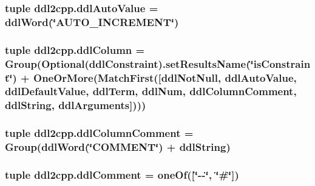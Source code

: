 \subsubsection[{ddl\+Auto\+Value}]{\setlength{\rightskip}{0pt plus 5cm}tuple ddl2cpp.\+ddl\+Auto\+Value = {\bf ddl\+Word}(\char`\"{}A\+U\+T\+O\+\_\+\+I\+N\+C\+R\+E\+M\+E\+N\+T\char`\"{})}\label{namespaceddl2cpp_adfd7af04711f00ee8c041d1a9dc8a5ff}
\hypertarget{namespaceddl2cpp_a0b84b33d051fb3679933a73f07862855}{}
\subsubsection[{ddl\+Column}]{\setlength{\rightskip}{0pt plus 5cm}tuple ddl2cpp.\+ddl\+Column = Group(Optional({\bf ddl\+Constraint}).set\+Results\+Name(\char`\"{}is\+Constraint\char`\"{}) + One\+Or\+More(Match\+First(\mbox{[}{\bf ddl\+Not\+Null}, {\bf ddl\+Auto\+Value}, {\bf ddl\+Default\+Value}, {\bf ddl\+Term}, {\bf ddl\+Num}, {\bf ddl\+Column\+Comment}, {\bf ddl\+String}, {\bf ddl\+Arguments}\mbox{]})))}\label{namespaceddl2cpp_a0b84b33d051fb3679933a73f07862855}
\hypertarget{namespaceddl2cpp_acd5cc6bf8c3155c1d9b5c96f837a56da}{}
\subsubsection[{ddl\+Column\+Comment}]{\setlength{\rightskip}{0pt plus 5cm}tuple ddl2cpp.\+ddl\+Column\+Comment = Group({\bf ddl\+Word}(\char`\"{}C\+O\+M\+M\+E\+N\+T\char`\"{}) + ddl\+String)}\label{namespaceddl2cpp_acd5cc6bf8c3155c1d9b5c96f837a56da}
\hypertarget{namespaceddl2cpp_a353ef6fb26a14fe2a057372cee430a52}{}
\subsubsection[{ddl\+Comment}]{\setlength{\rightskip}{0pt plus 5cm}tuple ddl2cpp.\+ddl\+Comment = one\+Of(\mbox{[}\char`\"{}-\/-\/\char`\"{}, \char`\"{}\#\char`\"{}\mbox{]})}\label{namespaceddl2cpp_a353ef6fb26a14fe2a057372cee430a52}
\hypertarget{namespaceddl2cpp_a97e4713ef26f221c7a6e84b47053bb04}{}
